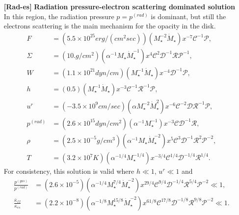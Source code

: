 \documentclass[a4paper,fleqn,usenatbib]{mnrasMOD}
\numberwithin{equation}{section}
\begin{document}
\begin{enumerate}
\item[{\bf [Rad-es]}]{\bf Radiation pressure-electron scattering dominated solution}\\
In this region, the radiation pressure $p=p^{(rad)}$ is dominant, but still the electrons scattering is the main mechanism for the opacity in the disk. 
\begin{subequations} \label{sol rades}
\begin{align}
F 				&= \left(5.5 \times 10^{25} erg/(cm^2 sec)\right) \left(M_{\star}^{-2} \dot{M}_{\star}\right) x^{-7} \mathcal{C}^{-1} \mathcal{P}, \label{F rades}\\
\Sigma   &=\left(10. g/cm^2 \right) \left(\alpha^{-1} M_{\star} \dot{M}_{\star}^{-1}\right) x^{4} \mathcal{C}^{2} \mathcal{D}^{-1} \mathcal{R} \mathcal{P}^{-1},\\
W				&=\left(1.1 \times 10^{21} dyn/cm\right) \left(M_{\star}^{-1} \dot{M}_{\star}\right) x^{-4} \mathcal{D}^{-1} \mathcal{P},\\
h				&=\left(0.5 \right) \left( M_{\star}^{-1} \dot{M}_{\star} \right) x^{-3} \mathcal{C}^{-1} \mathcal{R}^{-1} \mathcal{P}, \label{h rades}\\
u^{r}		&=\left(-3.5 \times 10^9  cm/sec \right) \left(\alpha M_{\star}^{-2} \dot{M}_{\star}^{2}\right) x^{-6} \mathcal{C}^{-2} \mathcal{D} \mathcal{R}^{-1} \mathcal{P},\\
p^{(rad)}&=\left(2.6 \times 10^{15} dyn/cm^2\right) \left(\alpha^{-1} M_{\star}^{-1} \right) x^{-3} \mathcal{C} \mathcal{D}^{-1} \mathcal{R},\\
\rho			&=\left(2.5 \times 10^{-5} g/cm^3\right) \left(\alpha^{-1} M_{\star} \dot{M}_{\star}^{-2}\right) x^{5} \mathcal{C}^{3} \mathcal{D}^{-1} \mathcal{R}^{2} \mathcal{P}^{-2},\\
T				&=\left(3.2 \times 10^7 K\right) \left(\alpha^{-1/4} M_{\star}^{-1/4} \right) x^{-3/4} \mathcal{C}^{1/4} \mathcal{D}^{-1/4} \mathcal{R}^{1/4}. \label{T inner}
\end{align}
\end{subequations}
For consistency, this solution is valid where $h\ll1$, $u^r \ll1$ and 
\begin{subequations} \label{consistency rades}
\begin{align}
\frac{p^{(gas)}}{p^{(rad)}}			&=\left(2.6 \times 10^{-5}\right) \left(\alpha^{-1/4} M_{\star}^{7/4} \dot{M}_{\star}^{-2}\right) x^{29/4} \mathcal{C}^{9/4} \mathcal{D}^{-1/4} \mathcal{R}^{5/4} \mathcal{P}^{-2} \ll 1,\\
\frac{\bar{\kappa}_{ff}}{\bar{\kappa}_{es}}			&=\left(2.2 \times 10^{-8}\right) \left( \alpha^{-1/8} M_{\star}^{15/8} \dot{M}_{\star}^{-2}\right) x^{61/8} \mathcal{C}^{17/8} \mathcal{D}^{-1/8} \mathcal{R}^{9/8} \mathcal{P}^{-2} \ll1.
\end{align}
\end{subequations}



\end{enumerate}
\end{document}
